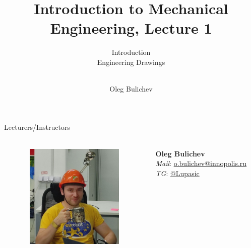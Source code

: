 \documentclass[aspectratio=169]{beamer}
\title[IME]{Introduction to Mechanical Engineering, Lecture 1} %
\subtitle{Introduction  
\\ Engineering Drawings  \\   
\ } %
\author{Oleg Bulichev}
\newcommand{\fbckg}[1]{\usebackgroundtemplate{\texttt{[image: \#1]}}}%
\begin{document}
\setlength{\abovedisplayskip}{0pt}
\setlength{\belowdisplayskip}{0pt}
\setlength{\abovedisplayshortskip}{0pt}
\setlength{\belowdisplayshortskip}{0pt}

\fbckg{fibeamer/figs/title_page.png}

\fbckg{fibeamer/figs/common.png}

\note{\scriptsize \begin{itemize}
        \item \
    \end{itemize}}

\begin{frame}[t]{Lecturers/Instructors}
    \framesubtitle{}
    \begin{columns}[T,onlytextwidth]
        \begin{column}{0.49\textwidth}
            \begin{figure}[H]
                \centering\includegraphics[height=5cm,width=1\textwidth,keepaspectratio]{Oleg.jpg}
                \label{fig:Oleg.jpg}
            \end{figure}
        \end{column}
        \begin{column}{0.49\textwidth}
            \Large
            \vspace{2cm}
            \centering
            \textbf{Oleg Bulichev} \\
            \textit{Mail}: \url{o.bulichev@innopolis.ru}\\
            \textit{TG}: \url{@Lupasic}
        \end{column}
    \end{columns}
\end{frame}
\end{document}
